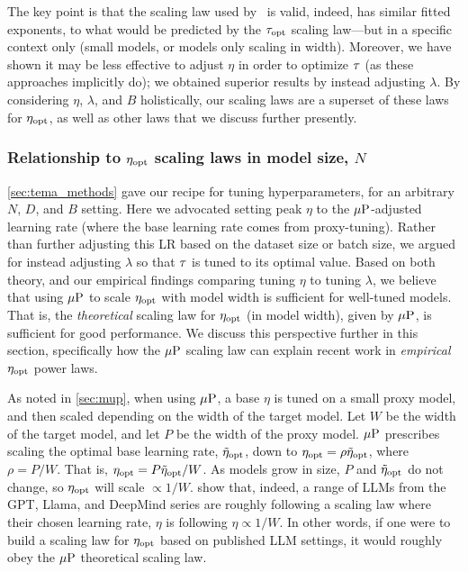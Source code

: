 The key point is that the scaling law used by
\citet{shen2024power}\ is valid, indeed, has similar fitted exponents,
to what would be predicted by the ${\tau}_{\text{opt}}$ scaling law---but in a
specific context only (small models, or models only scaling in width).
%
Moreover, we have shown it may be less effective to adjust $\eta$ in
order to optimize $\tau$ (as these approaches implicitly do); we
obtained superior results by instead adjusting $\lambda$.  By
considering $\eta$, $\lambda$, and $B$ holistically, our scaling laws
are a superset of these laws for $\eta_{\text{opt}}$, as well as other laws that
we discuss further presently.

\subsubsection{Relationship to $\eta_{\text{opt}}$ scaling laws in model size, $N$}\label{sec:appendix_etaopt}

\cref{sec:tema_methods} gave our recipe for tuning hyperparameters,
for an arbitrary $N$, $D$, and $B$ setting.  Here we advocated setting
peak $\eta$ to the $\mbox{$\mu$P}$-adjusted learning rate (where the base
learning rate comes from proxy-tuning).
%
Rather than further adjusting this LR based on the dataset size or
batch size, we argued for instead adjusting $\lambda$ so that
$\tau$ is tuned to its optimal value.  Based on both theory, and
our empirical findings comparing tuning $\eta$ to tuning $\lambda$, we
believe that using $\mbox{$\mu$P}$ to scale $\eta_{\text{opt}}$ with model width is
sufficient for well-tuned models.
%
That is, the \emph{theoretical} scaling law for $\eta_{\text{opt}}$ (in model
width), given by $\mbox{$\mu$P}$, is sufficient for good performance.
%
We discuss this perspective further in this section, specifically how
the $\mbox{$\mu$P}$ scaling law can explain recent work in \emph{empirical}
$\eta_{\text{opt}}$ power laws.

As noted in \cref{sec:mup}, when using $\mbox{$\mu$P}$, a base $\eta$ is tuned
on a small proxy model, and then scaled depending on the width of the
target model.  Let $W$ be the width of the target model, and let $P$
be the width of the proxy model.  $\mbox{$\mu$P}$ prescribes scaling the
optimal base learning rate, $\tilde{\eta}_{\text{opt}}$, down to $\eta_{\text{opt}} =
\rho\tilde{\eta}_{\text{opt}}$, where $\rho=P/W$.  That is, $\eta_{\text{opt}} =
P\tilde{\eta}_{\text{opt}}/W$.
%
As models grow in size, $P$ and $\tilde{\eta}_{\text{opt}}$ do not change, so
$\eta_{\text{opt}}$ will scale $\propto 1/W$.
%
\citet[Figure~2]{dey2024practitioner} show that, indeed, a range of
LLMs from the GPT, Llama, and DeepMind series are roughly following a
scaling law where their chosen learning rate, $\eta$ is following
$\eta \propto {1}/{W}$.
%
In other words, if one were to build a scaling law for $\eta_{\text{opt}}$ based
on published LLM settings, it would roughly obey the $\mbox{$\mu$P}$
theoretical scaling law.

